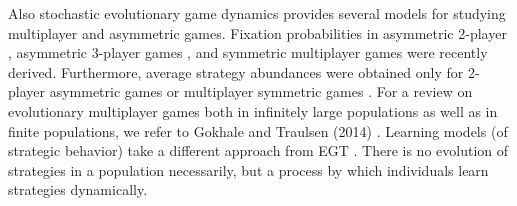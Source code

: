 \documentclass[11pt]{article}
\theoremstyle{plainCl1}
\theoremstyle{plainCl2}
\begin{document}
Also stochastic evolutionary game dynamics \cite{Nowak:Nature:2004, Traulsen:bookchapter:2009} provides several models for studying multiplayer and asymmetric games. 
Fixation probabilities \cite{Fudenberg:TPB:2006} in asymmetric 2-player \cite{Sekiguchi:DGA:2017}, asymmetric 3-player games \cite{Sekiguchi:DGAA:2022}, and symmetric multiplayer games \cite{Kurokawa:PRSB:2009, gokhale:PNAS:2010} were recently derived. Furthermore, average strategy abundances \cite{antal:JTB:2009a, antal:JTB:2009b} were obtained only for 2-player asymmetric games \cite{Ohtsuki:JTB:2010, Sekiguchi:PA:2013} or multiplayer symmetric games \cite{gokhale:JTB:2011, Wu:Games:2013, Kroumi:JMB:2022}. For a review on evolutionary multiplayer games both in infinitely large populations as well as in finite populations, we refer to Gokhale and Traulsen (2014) \cite{Gokhale:DGAA:2014}. 
Learning models (of strategic behavior) take a different approach from EGT \cite{Sandholm:BioSys:1996, Fudenberg:book:1998b, Macy:PNAS:2002, Hofbauer:GEB:2005, Tuyls:bookchapter:2005, Galla:PNAS:2013, Barfuss:PRE:2019, Barfuss:PNAS:2020, Pangallo:GEB:2022}. There is no evolution of strategies in a population necessarily, but a process by which individuals learn strategies dynamically. \\ 





\end{document}
